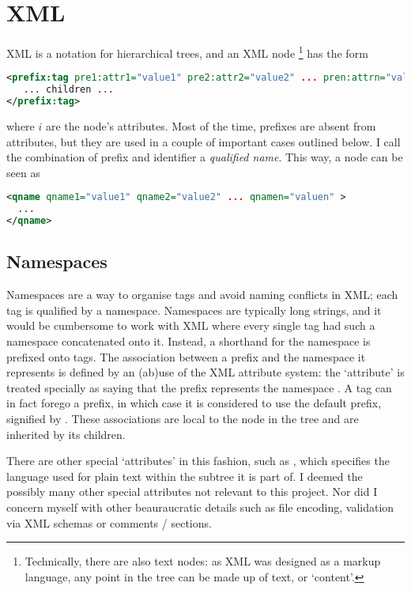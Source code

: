 \section{XML}
XML is a notation for hierarchical trees, and an XML node \footnote{Technically, there are also text nodes: as XML was designed as a markup language, any point in the tree can be made up of text, or `content'.} has the form
\begin{lstlisting}[language=xml]
<prefix:tag pre1:attr1="value1" pre2:attr2="value2" ... pren:attrn="valuen" >
   ... children ...
</prefix:tag>
\end{lstlisting}
where \(i\) are the node's attributes. Most of the time, prefixes are absent from attributes, but they are used in a couple of important cases outlined below. I call the combination of prefix and identifier a \emph{qualified name}. This way, a node can be seen as
\begin{lstlisting}[language=xml]
<qname qname1="value1" qname2="value2" ... qnamen="valuen" >
  ...
</qname>
\end{lstlisting}

\subsection{Namespaces}
Namespaces are a way to organise tags and avoid naming conflicts in XML; each tag is qualified by a namespace. Namespaces are typically long strings, and it would be cumbersome to work with XML where every single tag had such a namespace concatenated onto it. Instead, a shorthand for the namespace is prefixed onto tags. The association between a prefix and the namespace it represents is defined by an (ab)use of the XML attribute system: the `attribute'  is treated specially as saying that the prefix  represents the namespace . A tag can in fact forego a prefix, in which case it is considered to use the default prefix, signified by . These associations are local to the node in the tree and are inherited by its children.

There are other special `attributes' in this fashion, such as , which specifies the language used for plain text within the subtree it is part of. I deemed the possibly many other special attributes not relevant to this project. Nor did I concern myself with other beauraucratic details such as file encoding, validation via XML schemas or comments /  sections.

